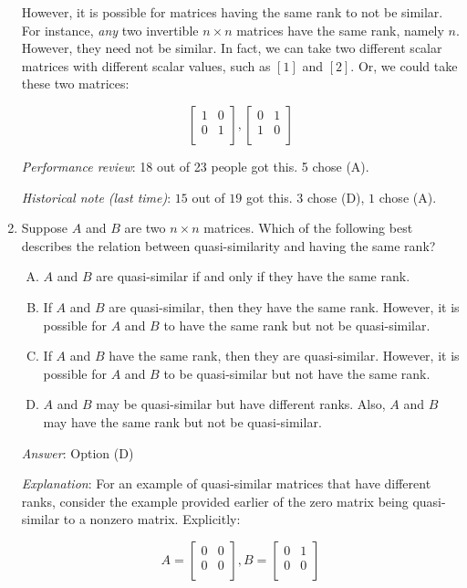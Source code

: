 \documentclass[10pt]{amsart}
\begin{document}
\begin{enumerate}
  However, it is possible for matrices having the same rank to not be
  similar. For instance, {\em any} two invertible $n \times n$
  matrices have the same rank, namely $n$. However, they need not be
  similar. In fact, we can take two different scalar matrices with
  different scalar values, such as $[1]$ and $[2]$. Or, we could take
  these two matrices:

  $$\left[\begin{matrix} 1 & 0 \\ 0 & 1 \\\end{matrix}\right], \left[\begin{matrix} 0 & 1 \\ 1 & 0 \\\end{matrix}\right]$$

  {\em Performance review}: 18 out of 23 people got this. 5 chose (A).

  {\em Historical note (last time)}: $15$ out of $19$ got this. $3$ chose (D),
  $1$ chose (A).

\item Suppose $A$ and $B$ are two $n \times n$ matrices. Which of the
  following best describes the relation between quasi-similarity and having
  the same rank?

  \begin{enumerate}[(A)]
  \item $A$ and $B$ are quasi-similar if and only if they have the same rank.
  \item If $A$ and $B$ are quasi-similar, then they have the same
    rank. However, it is possible for $A$ and $B$ to have the same
    rank but not be quasi-similar.
  \item If $A$ and $B$ have the same rank, then they are
    quasi-similar. However, it is possible for $A$ and $B$ to be
    quasi-similar but not have the same rank.
  \item $A$ and $B$ may be quasi-similar but have different ranks. Also, $A$
    and $B$ may have the same rank but not be quasi-similar.
  \end{enumerate}

  {\em Answer}: Option (D)

  {\em Explanation}: For an example of quasi-similar matrices that
  have different ranks, consider the example provided earlier of the
  zero matrix being quasi-similar to a nonzero matrix. Explicitly:

  $$A = \left[\begin{matrix} 0 & 0 \\ 0 & 0 \\\end{matrix}\right], B = \left[\begin{matrix} 0 & 1 \\ 0 & 0 \\\end{matrix}\right]$$


\end{enumerate}
\end{document}
